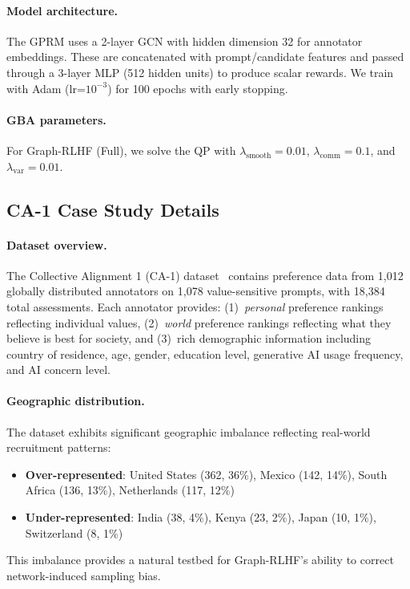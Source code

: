 \documentclass{article}
\theoremstyle{plain}
\theoremstyle{definition}
\theoremstyle{remark}
\begin{document}
\paragraph{Model architecture.}
The GPRM uses a 2-layer GCN with hidden dimension 32 for annotator embeddings. These are concatenated with prompt/candidate features and passed through a 3-layer MLP (512 hidden units) to produce scalar rewards. We train with Adam (lr=$10^{-3}$) for 100 epochs with early stopping.

\paragraph{GBA parameters.}
For Graph-RLHF (Full), we solve the QP with $\lambda_{\text{smooth}} = 0.01$, $\lambda_{\text{comm}} = 0.1$, and $\lambda_{\text{var}} = 0.01$.

\subsection{CA-1 Case Study Details}
\label{app:ca1-details}

\paragraph{Dataset overview.}
The Collective Alignment 1 (CA-1) dataset~\citep{openai2025ca1} contains preference data from 1,012 globally distributed annotators on 1,078 value-sensitive prompts, with 18,384 total assessments. Each annotator provides: (1)~\textit{personal} preference rankings reflecting individual values, (2)~\textit{world} preference rankings reflecting what they believe is best for society, and (3)~rich demographic information including country of residence, age, gender, education level, generative AI usage frequency, and AI concern level.

\paragraph{Geographic distribution.}
The dataset exhibits significant geographic imbalance reflecting real-world recruitment patterns:
\begin{itemize}
    \item \textbf{Over-represented}: United States (362, 36\%), Mexico (142, 14\%), South Africa (136, 13\%), Netherlands (117, 12\%)
    \item \textbf{Under-represented}: India (38, 4\%), Kenya (23, 2\%), Japan (10, 1\%), Switzerland (8, 1\%)
\end{itemize}
This imbalance provides a natural testbed for Graph-RLHF's ability to correct network-induced sampling bias.
\end{document}
